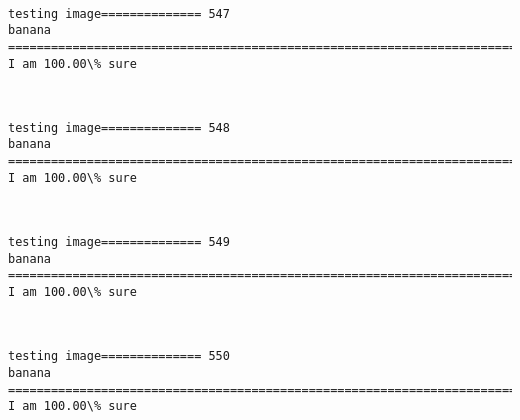 \documentclass[11pt]{article}
\begin{document}
    \begin{center}
    \end{center}
    { \hspace*{\fill} \\}
    
    \begin{Verbatim}[commandchars=\\\{\}]
testing image============== 547
banana
============================================================================
I am 100.00\% sure

    \end{Verbatim}

    \begin{center}
    \end{center}
    { \hspace*{\fill} \\}
    
    \begin{Verbatim}[commandchars=\\\{\}]
testing image============== 548
banana
============================================================================
I am 100.00\% sure

    \end{Verbatim}

    \begin{center}
    \end{center}
    { \hspace*{\fill} \\}
    
    \begin{Verbatim}[commandchars=\\\{\}]
testing image============== 549
banana
============================================================================
I am 100.00\% sure

    \end{Verbatim}

    \begin{center}
    \end{center}
    { \hspace*{\fill} \\}
    
    \begin{Verbatim}[commandchars=\\\{\}]
testing image============== 550
banana
============================================================================
I am 100.00\% sure

    \end{Verbatim}
\end{document}
